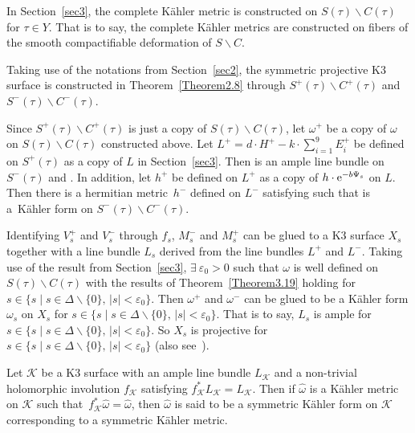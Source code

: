 \documentclass[10pt,a4paper]{amsart}
\numberwithin{equation}{section}
\begin{document}
In Section~\ref{sec3}, the complete K\"ahler metric is constructed on $S(\tau)\backslash C(\tau)$ for $\tau \in Y$. That is to say, the complete K\"ahler metrics are constructed on fibers of the smooth compactifiable deformation of $S\backslash C$.

Taking use of the notations from Section~\ref{sec2}, the symmetric projective K3 surface is constructed in Theorem~\ref{Theorem2.8} through $S^+(\tau)\backslash C^+(\tau)$ and $S^-(\tau)\backslash C^-(\tau)$.

Since $S^+(\tau)\backslash C^+(\tau)$ is just a copy of $S(\tau)\backslash C(\tau)$, let $\omega^+$ be a copy of $\omega$ on $S(\tau)\backslash C(\tau)$ constructed above. Let $L^{+}=d\cdot H^{+}-k \cdot \sum _{i=1}^9 E_i^{+}$ be defined on $S^+(\tau)$ as a copy of $L$ in Section~\ref{sec3}. Then  is an ample line bundle on $S^-(\tau)$ and . In addition, let $h^+$ be defined on $L^+$ as a copy of $h\cdot {\rm e}^{-b\Psi_s}$ on $L$. Then there is a hermitian metric~$h^-$ defined on $L^-$ satisfying  such that  is a~K\"ahler form on $S^-(\tau)\backslash C^-(\tau)$.

Identifying $V_s^+$ and $V_s^-$ through $f_s$, $M^-_s$ and $M^+_s$ can be glued to a K3 surface $X_s$ together with a line bundle $L_s$ derived from the line bundles $L^+$ and $L^-$. Taking use of the result from Section~\ref{sec3}, $\exists \ \varepsilon_0 >0$ such that $\omega$ is well defined on $S(\tau)\backslash C(\tau)$ with the results of Theorem~\ref{Theorem3.19} holding for $s \in \{ s\mid s \in \Delta \backslash \{ 0 \},\, |s|<\varepsilon_0 \}$. Then $\omega^+$ and $\omega^-$ can be glued to be a K\"ahler form $\omega_s$ on $X_s$ for $s \in \{ s\mid s \in \Delta \backslash \{ 0 \},\, |s|<\varepsilon_0 \}$. That is to say, $L_s$ is ample for~${s \in \{ s\mid s \in \Delta \backslash \{ 0 \},\, |s|<\varepsilon_0 \}}$. So $X_s$ is projective for $s \in \{ s\mid s \in \Delta \backslash \{ 0 \}, \, |s|<\varepsilon_0 \}$ (also see~\cite[Theorem~1.2]{Takayuki-Takato2}).

\begin{Definition} \label{Definition4.1}
Let $\mathcal{K}$ be a K3 surface with an ample line bundle $L_\mathcal{K}$ and a non-trivial holomorphic involution $f_\mathcal{K}$ satisfying $f^*_{\mathcal{K}}L_{\mathcal{K}}=L_{\mathcal{K}}$. Then if $\widehat{\omega}$ is a K\"ahler metric on $\mathcal{K}$ such that~${f^*_{\mathcal{K}}\widehat{\omega}=\widehat{\omega}}$, then $\widehat{\omega}$ is said to be a symmetric K\"ahler form on $\mathcal{K}$ corresponding to a symmetric K\"ahler metric.
\end{Definition}
\end{document}
